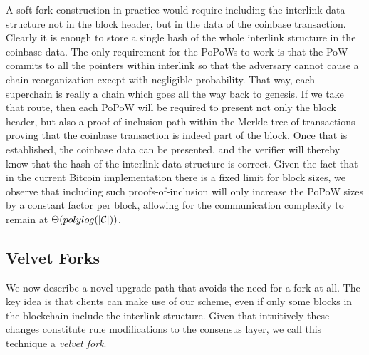 A soft fork construction in practice would require including the interlink
data structure not in the block header, but in the data of the coinbase
transaction.  Clearly it is enough to store a single hash of the whole
interlink structure in the coinbase data. The only requirement for the PoPoWs
to work is that the PoW commits to all the pointers within interlink so that
the adversary cannot cause a chain reorganization except with negligible
probability. That way, each superchain is really a chain which goes all the
way back to genesis. If we take that route, then each PoPoW will be required
to present not only the block header, but also a proof-of-inclusion path
within the Merkle tree of transactions proving that the coinbase transaction
is indeed part of the block. Once that is established, the coinbase data can
be presented, and the verifier will thereby know that the hash of the
interlink data structure is correct. Given the fact that in the current
Bitcoin implementation there is a fixed limit for block sizes, we observe that
including such proofs-of-inclusion will only increase the PoPoW sizes by a
constant factor per block, allowing for the communication complexity to remain
at $\Theta(polylog(|\mathcal{C}|))$.

\subsection{Velvet Forks}
We now describe a novel upgrade path that avoids the need for a fork at all.
The key idea is that clients can make use of our scheme, even if only some blocks in the blockchain include the interlink structure.
Given that intuitively these
changes constitute rule modifications to the consensus layer, we call this
technique a \textit{velvet fork}.

